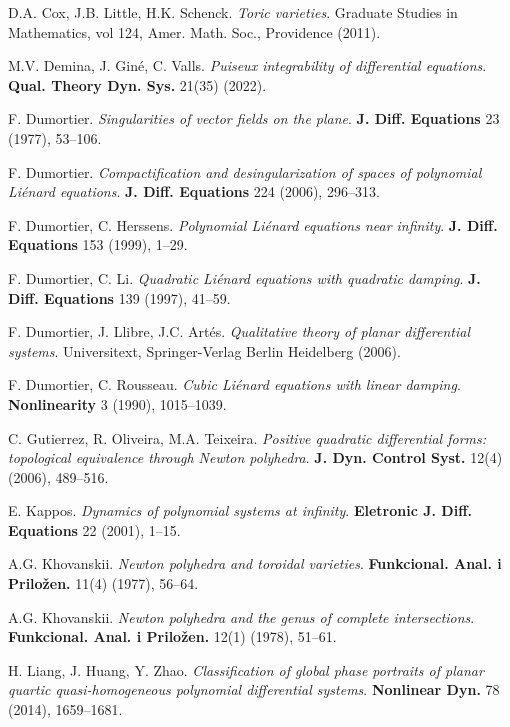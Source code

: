 \documentclass[12pt]{amsart}
\begin{document}
\begin{thebibliography}{99}
 D.A. Cox, J.B. Little, H.K. Schenck. \emph{Toric varieties}. Graduate Studies in Mathematics, vol 124, Amer. Math. Soc., Providence (2011). 

 M.V. Demina, J. Giné, C. Valls. \emph{Puiseux integrability of differential equations}. \textbf{Qual. Theory Dyn. Sys.} 21(35) (2022).

 F. Dumortier. \emph{Singularities of vector fields on the plane}. \textbf{J. Diff. Equations} 23 (1977), 53–106.

 F. Dumortier. \emph{Compactification and desingularization of spaces of polynomial Liénard equations}. \textbf{J. Diff. Equations} 224 (2006), 296--313.

 F. Dumortier, C. Herssens. \emph{Polynomial Liénard equations near infinity}. \textbf{J. Diff. Equations} 153 (1999), 1--29.

 F. Dumortier, C. Li. \emph{Quadratic Liénard equations with quadratic damping}. \textbf{J. Diff. Equations} 139 (1997), 41--59.

 F. Dumortier, J. Llibre, J.C. Artés. \emph{Qualitative theory of planar differential systems}. Universitext, Springer-Verlag Berlin Heidelberg (2006).

 F. Dumortier, C. Rousseau. \emph{Cubic Liénard equations with linear damping}. \textbf{Nonlinearity} 3 (1990), 1015--1039.

 C. Gutierrez, R. Oliveira, M.A. Teixeira. \emph{Positive quadratic differential forms: topological equivalence through Newton polyhedra}. \textbf{J. Dyn. Control Syst.} 12(4) (2006), 489--516.


 E. Kappos. \emph{Dynamics of polynomial systems at infinity}. \textbf{Eletronic J. Diff. Equations} 22 (2001), 1--15.

 A.G. Khovanskii. \emph{Newton polyhedra and toroidal varieties}. \textbf{Funkcional. Anal. i Priložen.} 11(4) (1977), 56--64.

 A.G. Khovanskii. \emph{Newton polyhedra and the genus of complete intersections}. \textbf{Funkcional. Anal. i Priložen.} 12(1) (1978), 51--61.

 H. Liang, J. Huang, Y. Zhao. \emph{Classification of global phase portraits of planar quartic quasi-homogeneous polynomial differential systems}. \textbf{Nonlinear Dyn.} 78 (2014), 1659--1681.


\end{thebibliography}
\end{document}
